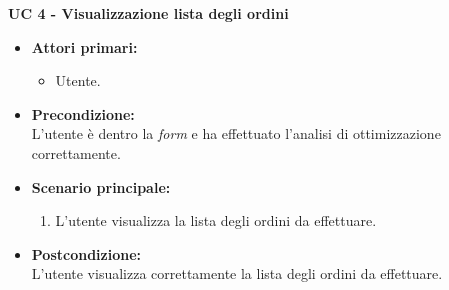 \vspace{0.5cm}

\noindent \textbf{\large UC 4 - Visualizzazione lista degli ordini}
\label{uc:visualizzazione-lista-ordini}
\begin{itemize}

	\item \textbf{Attori primari: }
		\begin{itemize}
			\item Utente.
		\end{itemize}

	\item \textbf{Precondizione: }\\[0.3cm]
		L'utente è dentro la \textit{form} e ha effettuato l'analisi di ottimizzazione correttamente.

	\item \textbf{Scenario principale: }
		\begin{enumerate}
			\item L'utente visualizza la lista degli ordini da effettuare.
		\end{enumerate}
		

	\item \textbf{Postcondizione: }\\[0.3cm]
		L'utente visualizza correttamente la lista degli ordini da effettuare.

\end{itemize}

\vspace{0.5cm}

